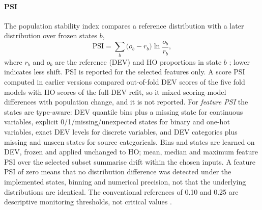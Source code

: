 \documentclass[final,5p,twocolumn]{elsarticle}
\newcommand{\PSI}{\mathrm{PSI}}
\begin{document}
\paragraph{PSI}
The population stability index compares a reference distribution with a later distribution over frozen states $b$,
\begin{equation}
    \PSI=\sum_{b}\big(o_b-r_b\big)\ln\frac{o_b}{r_b},
    \label{eq:psi}
\end{equation}
where $r_b$ and $o_b$ are the reference (DEV) and HO proportions in state $b$ \cite{siddiqi2006,yurdakul2020}; lower indicates less shift. PSI is reported for the selected features only. A score PSI computed in earlier versions compared out-of-fold DEV scores of the five fold models with HO scores of the full-DEV refit, so it mixed scoring-model differences with population change, and it is not reported. For \emph{feature PSI} the states are type-aware: DEV quantile bins plus a missing state for continuous variables, explicit 0/1/missing/unexpected states for binary and one-hot variables, exact DEV levels for discrete variables, and DEV categories plus missing and unseen states for source categoricals. Bins and states are learned on DEV, frozen and applied unchanged to HO; mean, median and maximum feature PSI over the selected subset summarise drift within the chosen inputs. A feature PSI of zero means that no distribution difference was detected under the implemented states, binning and numerical precision, not that the underlying distributions are identical. The conventional references of 0.10 and 0.25 are descriptive monitoring thresholds, not critical values \cite{yurdakul2020}.
\end{document}
